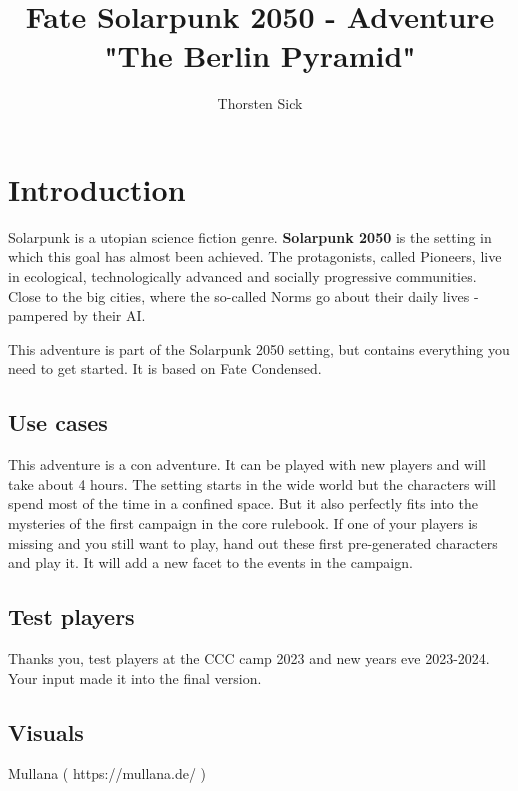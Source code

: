\documentclass{book}
\title{Fate Solarpunk 2050 - Adventure "The Berlin Pyramid"}
\author{Thorsten Sick}
\begin{document}
%
%
\mbox{}
\thispagestyle{empty}
\BgThispage


\chapter{Introduction}

Solarpunk is a utopian science fiction genre. \textbf{Solarpunk 2050} is the setting in which this goal has almost been achieved. The protagonists, called Pioneers, live in ecological, technologically advanced and socially progressive communities. Close to the big cities, where the so-called Norms go about their daily lives - pampered by their AI.

This adventure is part of the Solarpunk 2050 setting, but contains everything you need to get started. It is based on Fate Condensed.

\section{Use cases}

This adventure is a con adventure. It can be played with new players and will take about 4 hours. The setting starts in the wide world but the characters will spend most of the time in a confined space. But it also perfectly fits into the mysteries of the first campaign in the core rulebook. If one of your players is missing and you still want to play, hand out these first pre-generated characters and play it. It will add a new facet to the events in the campaign.

\section{Test players}

Thanks you, test players at the CCC camp 2023 and new years eve 2023-2024. Your input made it into the final version.

\section{Visuals}

Mullana ( https://mullana.de/ )




\end{document}
